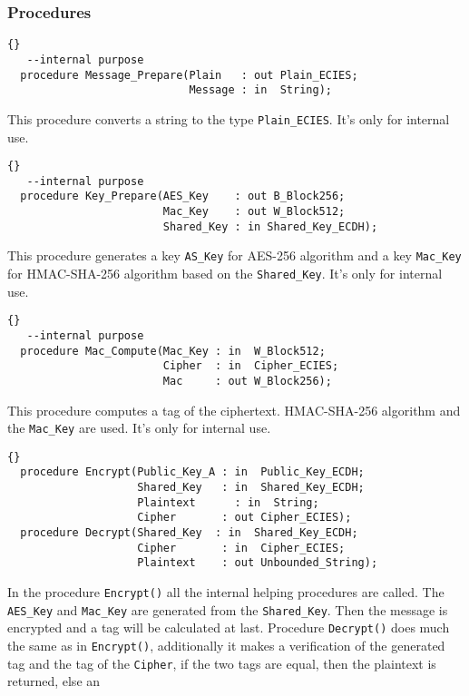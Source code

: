 \subsubsection*{Procedures}
\begin{lstlisting}{}
   --internal purpose
  procedure Message_Prepare(Plain   : out Plain_ECIES;
                            Message : in  String);
\end{lstlisting}
This procedure converts a string to the type
\texttt{Plain\_ECIES}. It's only for internal use.\\ \hhline
\begin{lstlisting}{}
   --internal purpose
  procedure Key_Prepare(AES_Key    : out B_Block256;
                        Mac_Key    : out W_Block512;
                        Shared_Key : in Shared_Key_ECDH);
\end{lstlisting}
This procedure generates a key \texttt{AS\_Key} for AES-256 algorithm
and a key \texttt{Mac\_Key} for HMAC-SHA-256 algorithm based on the
\texttt{Shared\_Key}. It's only for internal use.\\ \hhline
\begin{lstlisting}{}
   --internal purpose
  procedure Mac_Compute(Mac_Key : in  W_Block512;
                        Cipher  : in  Cipher_ECIES;
                        Mac     : out W_Block256);
\end{lstlisting}
This procedure computes a tag of the ciphertext. HMAC-SHA-256
algorithm and the \texttt{Mac\_Key} are used. It's only for internal
use.\\ \hhline
\begin{lstlisting}{}
  procedure Encrypt(Public_Key_A : in  Public_Key_ECDH;
                    Shared_Key   : in  Shared_Key_ECDH;
                    Plaintext	   : in  String;
                    Cipher       : out Cipher_ECIES);
  procedure Decrypt(Shared_Key	: in  Shared_Key_ECDH;
                    Cipher       : in  Cipher_ECIES;
                    Plaintext    : out Unbounded_String);

\end{lstlisting}
In the procedure \texttt{Encrypt()} all the internal helping
procedures are called. The \texttt{AES\_Key} and \texttt{Mac\_Key} are
generated from the \texttt{Shared\_Key}. Then the message is encrypted
and a tag will be calculated at last.  Procedure \texttt{Decrypt()}
does much the same as in \texttt{Encrypt()}, additionally it makes a
verification of the generated tag and the tag of the \texttt{Cipher},
if the two tags are equal, then the plaintext is returned, else an
